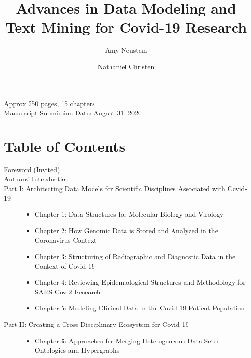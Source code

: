 \documentclass{statsoc}
\title[Data Modeling and Text Mining for Covid-19]{Advances in Data Modeling and Text Mining for Covid-19 Research}
\author[Amy Neustein]{Amy Neustein}
\author[Amy Neustein]{Nathaniel Christen}
\begin{document}
\vspace{1em}
\noindent{}Approx 250 pages, 15 chapters\\
Manuscript Submission Date: August 31, 2020\\




\section{Table of Contents}
\vspace{1em}

\begin{description}

\item[Foreword (Invited)]

\item[Authors' Introduction]


\item[Part I: Architecting Data Models for Scientific Disciplines Associated with Covid-19]

\begin{itemize}
\item Chapter 1: Data Structures for Molecular Biology and Virology

\item Chapter 2: How Genomic Data is Stored and Analyzed in the Coronavirus Context

\item Chapter 3: Structuring of Radiographic and Diagnostic Data in the Context of Covid-19

\item Chapter 4: Reviewing Epidemiological Structures and Methodology for SARS-Cov-2 Research

\item Chapter 5: Modeling Clinical Data in the Covid-19 Patient Population  

\end{itemize}

\item[Part II: Creating a Cross-Disciplinary Ecosystem for Covid-19]

\begin{itemize}

\item Chapter 6: \hspace{3pt} Approaches for Merging Heterogeneous Data Sets: Ontologies and Hypergraphs


\end{itemize}
\end{description}
\end{document}
